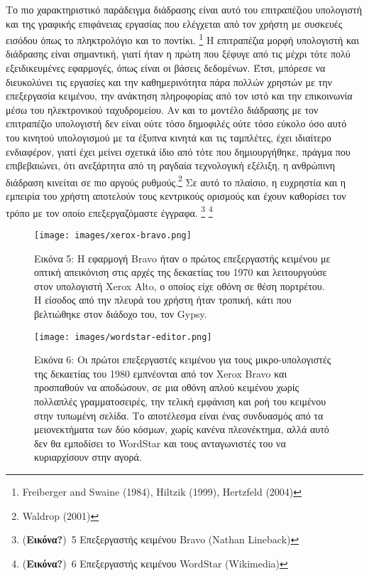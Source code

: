 \documentclass[
]{article}
\begin{document}
Το πιο χαρακτηριστικό παράδειγμα διάδρασης είναι αυτό του επιτραπέζιου
υπολογιστή και της γραφικής επιφάνειας εργασίας που ελέγχεται από τον
χρήστη με συσκευές εισόδου όπως το πληκτρολόγιο και το ποντίκι.
\footnote{Freiberger and Swaine (1984), Hiltzik (1999), Hertzfeld (2004)}
Η επιτραπέζια μορφή υπολογιστή και διάδρασης είναι σημαντική, γιατί ήταν
η πρώτη που ξέφυγε από τις μέχρι τότε πολύ εξειδικευμένες εφαρμογές,
όπως είναι οι βάσεις δεδομένων. Έτσι, μπόρεσε να διευκολύνει τις
εργασίες και την καθημερινότητα πάρα πολλών χρηστών με την επεξεργασία
κειμένου, την ανάκτηση πληροφορίας από τον ιστό και την επικοινωνία μέσω
του ηλεκτρονικού ταχυδρομείου. Αν και το μοντέλο διάδρασης με τον
επιτραπέζιο υπολογιστή δεν είναι ούτε τόσο δημοφιλές ούτε τόσο εύκολο
όσο αυτό του κινητού υπολογισμού με τα έξυπνα κινητά και τις ταμπλέτες,
έχει ιδιαίτερο ενδιαφέρον, γιατί έχει μείνει σχετικά ίδιο από τότε που
δημιουργήθηκε, πράγμα που επιβεβαιώνει, ότι ανεξάρτητα από τη ραγδαία
τεχνολογική εξέλιξη, η ανθρώπινη διάδραση κινείται σε πιο αργούς
ρυθμούς.\footnote{Waldrop (2001)} Σε αυτό το πλαίσιο, η ευχρηστία και η
εμπειρία του χρήστη αποτελούν τους κεντρικούς ορισμούς και έχουν
καθορίσει τον τρόπο με τον οποίο επεξεργαζόμαστε έγγραφα. \footnote{(\textbf{Εικόνα?})~5
  Επεξεργαστής κειμένου Bravo (Nathan Lineback)} \footnote{(\textbf{Εικόνα?})~6
  Επεξεργαστής κειμένου WordStar (Wikimedia)}

\leavevmode{}%
\begin{figure}
\hypertarget{fig:xerox-bravo}{%
\centering
\texttt{[image: images/xerox-bravo.png]}
\caption{Εικόνα 5: Η εφαρμογή Bravo ήταν ο πρώτος επεξεργαστής κειμένου
με οπτική απεικόνιση στις αρχές της δεκαετίας του 1970 και λειτουργούσε
στον υπολογιστή Xerox Alto, ο οποίος είχε οθόνη σε θέση πορτρέτου. Η
είσοδος από την πλευρά του χρήστη ήταν τροπική, κάτι που βελτιώθηκε στον
διάδοχο του, τον Gypsy.}\label{fig:xerox-bravo}
}
\end{figure}

\leavevmode{}%
\begin{figure}
\hypertarget{fig:wordstar-editor}{%
\centering
\texttt{[image: images/wordstar-editor.png]}
\caption{Εικόνα 6: Οι πρώτοι επεξεργαστές κειμένου για τους
μικρο-υπολογιστές της δεκαετίας του 1980 εμπνέονται από τον Xerox Bravo
και προσπαθούν να αποδώσουν, σε μια οθόνη απλού κειμένου χωρίς πολλαπλές
γραμματοσειρές, την τελική εμφάνιση και ροή του κειμένου στην τυπωμένη
σελίδα. Το αποτέλεσμα είναι ένας συνδυασμός από τα μειονεκτήματα των δύο
κόσμων, χωρίς κανένα πλεονέκτημα, αλλά αυτό δεν θα εμποδίσει το WordStar
και τους ανταγωνιστές του να κυριαρχίσουν στην
αγορά.}\label{fig:wordstar-editor}
}
\end{figure}
\end{document}
